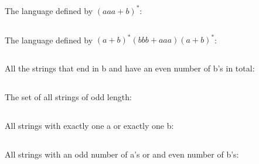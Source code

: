 \documentclass[12pt,a4paper,oneside]{report}
\begin{document}
\subsection{}
The language defined by $(aaa + b)^*$:
\subsection{}
The language defined by $(a + b)^*(bbb + aaa)(a + b)^*$:
\subsection{}
All the strings that end in b and have an even number of b's in total:
\subsection{}
The set of all strings of odd length:
\subsection{}
All strings with exactly one a or exactly one b:
\subsection{}
All strings with an odd number of a's or and even number of b's:
\end{document}
